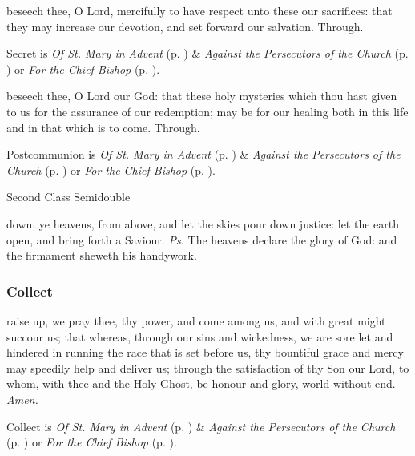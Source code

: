 \secret
{} beseech thee, O Lord, mercifully to have respect unto these our sacrifices: that they may increase our devotion, and set forward our salvation. Through.
\begin{rubric}
     Secret is \emph{Of St. Mary in Advent} (p. \pageref{SPMaryInAdvent}) \&  \emph{Against the Persecutors of the Church} (p. \pageref{SPAgainst}) or \emph{For the Chief Bishop} (p. \pageref{SPChiefBishop}).
\end{rubric}
\postcommunion
{} beseech thee, O Lord our God: that these holy mysteries which thou hast given to us for the assurance of our redemption; may be for our healing both in this life and in that which is to come. Through.
\begin{rubric}
     Postcommunion is \emph{Of St. Mary in Advent} (p. \pageref{SPMaryInAdvent}) \&  \emph{Against the Persecutors of the Church} (p. \pageref{SPAgainst}) or \emph{For the Chief Bishop} (p. \pageref{SPChiefBishop}).
\end{rubric}


\begin{inhead}
{Second Class Semidouble}
\end{inhead}
\fancyhead[RE,LO]{}

\properantiphonfix

\introit
{} down, ye heavens, from above, and let the skies pour down justice: let the earth open, and bring forth a Saviour. \textit{Ps.} The heavens declare the glory of God: and the firmament sheweth his handywork.

\subsubsection{Collect}
 raise up, we pray thee, thy power, and come among us, and with great might succour us; that whereas, through our sins and wickedness, we are sore let and hindered in running the race that is set before us, thy bountiful grace and mercy may speedily help and deliver us; through the satisfaction of thy Son our Lord, to whom, with thee and the Holy Ghost, be honour and glory, world without end. \textit{Amen.}
\begin{rubric}
     Collect is \emph{Of St. Mary in Advent} (p. \pageref{SPMaryInAdvent}) \&  \emph{Against the Persecutors of the Church} (p. \pageref{SPAgainst}) or \emph{For the Chief Bishop} (p. \pageref{SPChiefBishop}).
\end{rubric}

